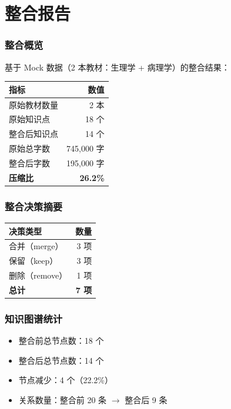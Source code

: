 \documentclass[12pt,a4paper]{article}
\begin{document}
\part{整合报告}

\section{整合概览}

基于 Mock 数据（2 本教材：生理学 + 病理学）的整合结果：

\begin{table}[H]
\centering
\begin{tabular}{lr}
\toprule
\textbf{指标} & \textbf{数值} \\
\midrule
原始教材数量 & 2 本 \\
原始知识点 & 18 个 \\
整合后知识点 & 14 个 \\
原始总字数 & 745,000 字 \\
整合后字数 & 195,000 字 \\
\textbf{压缩比} & \textbf{26.2\%} \\
\bottomrule
\end{tabular}
\end{table}

\section{整合决策摘要}

\begin{table}[H]
\centering
\begin{tabular}{lr}
\toprule
\textbf{决策类型} & \textbf{数量} \\
\midrule
合并（merge） & 3 项 \\
保留（keep） & 3 项 \\
删除（remove） & 1 项 \\
\textbf{总计} & \textbf{7 项} \\
\bottomrule
\end{tabular}
\end{table}

\section{知识图谱统计}

\begin{itemize}[leftmargin=2em]
    \item 整合前总节点数：18 个
    \item 整合后总节点数：14 个
    \item 节点减少：4 个（22.2\%）
    \item 关系数量：整合前 20 条 $\to$ 整合后 9 条
\end{itemize}
\end{document}
